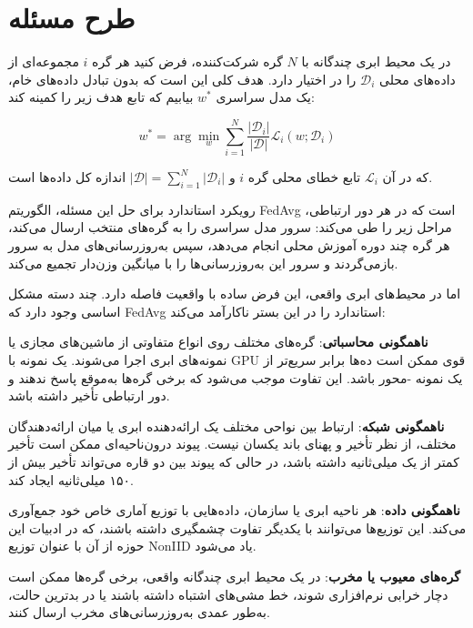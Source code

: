 \section{طرح مسئله}
\label{sec:problem}

در یک محیط ابری چندگانه با $N$ گره شرکت‌کننده، فرض کنید هر گره $i$ مجموعه‌ای از داده‌های محلی $\mathcal{D}_i$ را در اختیار دارد. هدف کلی این است که بدون تبادل داده‌های خام، یک مدل سراسری $w^*$ بیابیم که تابع هدف زیر را کمینه کند:

\begin{equation}
w^* = \arg\min_{w} \sum_{i=1}^{N} \frac{|\mathcal{D}_i|}{|\mathcal{D}|} \mathcal{L}_i(w; \mathcal{D}_i)
\label{eq:global_objective}
\end{equation}

که در آن $\mathcal{L}_i$ تابع خطای محلی گره $i$ و $|\mathcal{D}| = \sum_{i=1}^{N} |\mathcal{D}_i|$ اندازه کل داده‌ها است.

رویکرد استاندارد برای حل این مسئله، الگوریتم \gls{FedAvg} است که در هر دور ارتباطی، مراحل زیر را طی می‌کند: سرور مدل سراسری را به گره‌های منتخب ارسال می‌کند، هر گره چند دوره آموزش محلی انجام می‌دهد، سپس به‌روزرسانی‌های مدل به سرور بازمی‌گردند و سرور این به‌روزرسانی‌ها را با میانگین وزن‌دار تجمیع می‌کند.

اما در محیط‌های ابری واقعی، این فرض ساده با واقعیت فاصله دارد. چند دسته مشکل اساسی وجود دارد که \gls{FedAvg} استاندارد را در این بستر ناکارآمد می‌کند:

\begin{itemize}
    \tick \textbf{ناهمگونی محاسباتی}: گره‌های مختلف روی انواع متفاوتی از ماشین‌های مجازی یا نمونه‌های ابری اجرا می‌شوند. یک نمونه با \gls{GPU} قوی ممکن است ده‌ها برابر سریع‌تر از یک نمونه -محور باشد. این تفاوت موجب می‌شود که برخی گره‌ها به‌موقع پاسخ ندهند و دور ارتباطی تأخیر داشته باشد.
    
    \tick \textbf{ناهمگونی شبکه}: ارتباط بین نواحی مختلف یک ارائه‌دهنده ابری یا میان ارائه‌دهندگان مختلف، از نظر تأخیر و پهنای باند یکسان نیست. پیوند درون‌ناحیه‌ای ممکن است تأخیر کمتر از یک میلی‌ثانیه داشته باشد، در حالی که پیوند بین دو قاره می‌تواند تأخیر بیش از ۱۵۰ میلی‌ثانیه ایجاد کند.
    
    \tick \textbf{ناهمگونی داده}: هر ناحیه ابری یا سازمان، داده‌هایی با توزیع آماری خاص خود جمع‌آوری می‌کند. این توزیع‌ها می‌توانند با یکدیگر تفاوت چشمگیری داشته باشند، که در ادبیات این حوزه از آن با عنوان توزیع \gls{NonIID} یاد می‌شود.
    
    \tick \textbf{گره‌های معیوب یا مخرب}: در یک محیط ابری چندگانه واقعی، برخی گره‌ها ممکن است دچار خرابی نرم‌افزاری شوند، خط مشی‌های اشتباه داشته باشند یا در بدترین حالت، به‌طور عمدی به‌روزرسانی‌های مخرب ارسال کنند.
\end{itemize}

